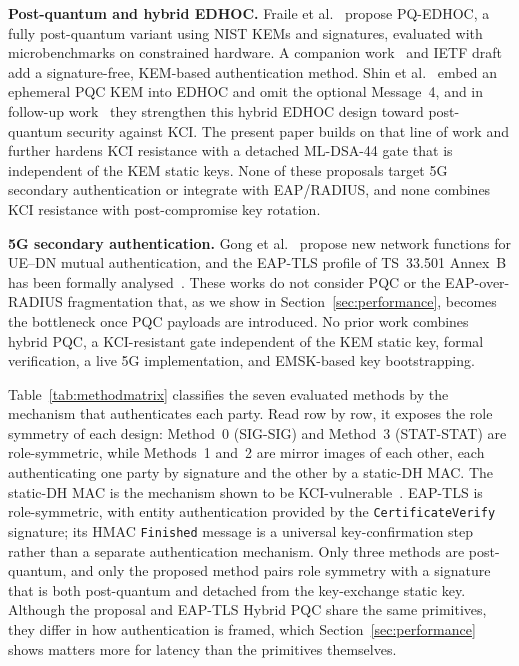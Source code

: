 \documentclass[symmetry,article,submit,moreauthors]{Definitions/mdpi}
\begin{document}
\textbf{Post-quantum and hybrid EDHOC.} Fraile et al.~\cite{FTK+25} propose PQ-EDHOC, a fully post-quantum variant using NIST KEMs and signatures, evaluated with microbenchmarks on constrained hardware. A companion work~\cite{fraile2025reinventing} and IETF draft~\cite{pocero} add a signature-free, KEM-based authentication method. Shin et al.~\cite{SIK+25} embed an ephemeral PQC KEM into EDHOC and omit the optional Message~4, and in follow-up work~\cite{SIK+26} they strengthen this hybrid EDHOC design toward post-quantum security against KCI. The present paper builds on that line of work and further hardens KCI resistance with a detached ML-DSA-44 gate that is independent of the KEM static keys. None of these proposals target 5G secondary authentication or integrate with EAP/RADIUS, and none combines KCI resistance with post-compromise key rotation.

\textbf{5G secondary authentication.} Gong et al.~\cite{Gong20} propose new network functions for UE--DN mutual authentication, and the EAP-TLS profile of TS~33.501 Annex~B has been formally analysed~\cite{RFC5216,TS33501}. These works do not consider PQC or the EAP-over-RADIUS fragmentation that, as we show in Section~\ref{sec:performance}, becomes the bottleneck once PQC payloads are introduced. No prior work combines hybrid PQC, a KCI-resistant gate independent of the KEM static key, formal verification, a live 5G implementation, and EMSK-based key bootstrapping.

Table~\ref{tab:methodmatrix} classifies the seven evaluated methods by the mechanism that authenticates each party. Read row by row, it exposes the role symmetry of each design: Method~0 (SIG-SIG) and Method~3 (STAT-STAT) are role-symmetric, while Methods~1 and~2 are mirror images of each other, each authenticating one party by signature and the other by a static-DH MAC. The static-DH MAC is the mechanism shown to be KCI-vulnerable~\cite{GM23,CDM24}. EAP-TLS is role-symmetric, with entity authentication provided by the \texttt{CertificateVerify} signature; its HMAC \texttt{Finished} message is a universal key-confirmation step rather than a separate authentication mechanism. Only three methods are post-quantum, and only the proposed method pairs role symmetry with a signature that is both post-quantum and detached from the key-exchange static key. Although the proposal and EAP-TLS Hybrid PQC share the same primitives, they differ in how authentication is framed, which Section~\ref{sec:performance} shows matters more for latency than the primitives themselves.
\end{document}
